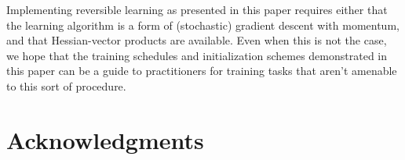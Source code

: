 \documentclass{article}
\begin{document}
Implementing reversible learning as presented in this paper requires either that the learning algorithm is a form of (stochastic) gradient descent with momentum, and that Hessian-vector products are available.
Even when this is not the case, we hope that the training schedules and initialization schemes demonstrated in this paper can be a guide to practitioners for training tasks that aren't amenable to this sort of procedure.

\section*{Acknowledgments} 




\end{document}
